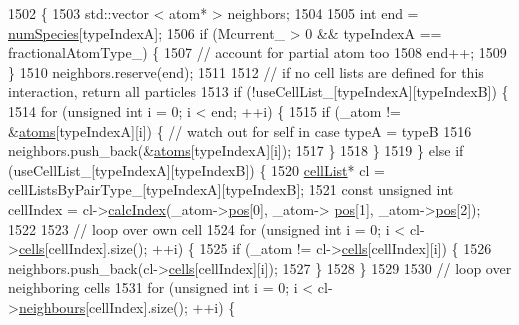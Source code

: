 \begin{DoxyCode}
1502                                                                                                            
                    \{
1503     std::vector < atom* > neighbors;
1504 
1505     \textcolor{keywordtype}{int} end = \hyperlink{classsim_system_a9eea865e6dc1cff377b1e79c4d9c23f0}{numSpecies}[typeIndexA];
1506     \textcolor{keywordflow}{if} (Mcurrent\_ > 0 && typeIndexA == fractionalAtomType\_) \{
1507         \textcolor{comment}{// account for partial atom too}
1508         end++;
1509     \}
1510     neighbors.reserve(end);
1511 
1512     \textcolor{comment}{// if no cell lists are defined for this interaction, return all particles}
1513     \textcolor{keywordflow}{if} (!useCellList\_[typeIndexA][typeIndexB]) \{
1514         \textcolor{keywordflow}{for} (\textcolor{keywordtype}{unsigned} \textcolor{keywordtype}{int} i = 0; i < end; ++i) \{
1515             \textcolor{keywordflow}{if} (\_atom != &\hyperlink{classsim_system_a90421b19082f7fb8fc23b7264b1161e4}{atoms}[typeIndexA][i]) \{ \textcolor{comment}{// watch out for self in case typeA = typeB}
1516                 neighbors.push\_back(&\hyperlink{classsim_system_a90421b19082f7fb8fc23b7264b1161e4}{atoms}[typeIndexA][i]);
1517             \}
1518         \}
1519     \} \textcolor{keywordflow}{else} \textcolor{keywordflow}{if} (useCellList\_[typeIndexA][typeIndexB]) \{
1520         \hyperlink{classcell_list}{cellList}* cl = cellListsByPairType\_[typeIndexA][typeIndexB];
1521         \textcolor{keyword}{const} \textcolor{keywordtype}{unsigned} \textcolor{keywordtype}{int} cellIndex = cl->\hyperlink{classcell_list_aa6b843131cd487164a137571c7343cab}{calcIndex}(\_atom->\hyperlink{classatom_a3ae5f4880e7831d8b2c9fda72b4eb24a}{pos}[0], \_atom->
      \hyperlink{classatom_a3ae5f4880e7831d8b2c9fda72b4eb24a}{pos}[1], \_atom->\hyperlink{classatom_a3ae5f4880e7831d8b2c9fda72b4eb24a}{pos}[2]);
1522 
1523         \textcolor{comment}{// loop over own cell}
1524         \textcolor{keywordflow}{for} (\textcolor{keywordtype}{unsigned} \textcolor{keywordtype}{int} i = 0; i < cl->\hyperlink{classcell_list_a10bc0c3ae819293b1e88bc7d1bfdb2aa}{cells}[cellIndex].size(); ++i) \{
1525             \textcolor{keywordflow}{if} (\_atom != cl->\hyperlink{classcell_list_a10bc0c3ae819293b1e88bc7d1bfdb2aa}{cells}[cellIndex][i]) \{
1526                 neighbors.push\_back(cl->\hyperlink{classcell_list_a10bc0c3ae819293b1e88bc7d1bfdb2aa}{cells}[cellIndex][i]);
1527             \}
1528         \}
1529 
1530         \textcolor{comment}{// loop over neighboring cells}
1531         \textcolor{keywordflow}{for} (\textcolor{keywordtype}{unsigned} \textcolor{keywordtype}{int} i = 0; i < cl->\hyperlink{classcell_list_ada607886d0e5a20d710dde694d6d989f}{neighbours}[cellIndex].size(); ++i) \{

\end{DoxyCode}
